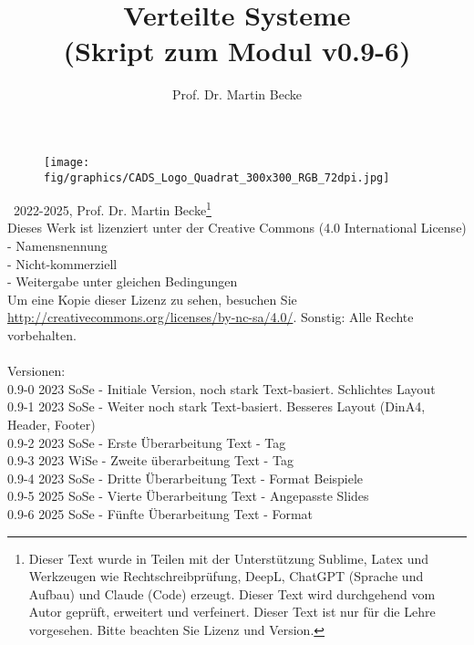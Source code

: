 \documentclass[a4paper,10pt]{book}
\title{Verteilte Systeme\\ (Skript zum Modul v0.9-6)}
\author{Prof. Dr. Martin Becke}
\begin{document}
\maketitle
\vspace*{\fill} %
\begin{figure}[h]
  \centering
  \texttt{[image: fig/graphics/CADS\_Logo\_Quadrat\_300x300\_RGB\_72dpi.jpg]} %
\end{figure}
\vspace*{\fill}

\newpage

\noindent
\textcopyright\ 2022-2025, Prof. Dr. Martin Becke\footnote{Dieser Text wurde in Teilen mit der Unterstützung Sublime, Latex und Werkzeugen wie Rechtschreibprüfung, DeepL, ChatGPT (Sprache und Aufbau) und Claude (Code) erzeugt. Dieser Text{} wird durchgehend vom Autor geprüft, erweitert und verfeinert. Dieser Text ist nur für die Lehre vorgesehen. Bitte beachten Sie Lizenz und Version.}\\
Dieses Werk ist lizenziert unter der Creative Commons (4.0 International License)\\
- Namensnennung\\ - Nicht-kommerziell\\ - Weitergabe unter gleichen Bedingungen \\Um eine Kopie dieser Lizenz zu sehen, besuchen Sie\\ \url{http://creativecommons.org/licenses/by-nc-sa/4.0/}. 
Sonstig: Alle Rechte vorbehalten.
\noindent
\\\\
Versionen:\\
0.9-0 2023 SoSe - Initiale Version, noch stark Text-basiert. Schlichtes Layout\\
0.9-1 2023 SoSe - Weiter noch stark Text-basiert. Besseres Layout (DinA4, Header, Footer)\\
0.9-2 2023 SoSe - Erste Überarbeitung Text - Tag\\
0.9-3 2023 WiSe - Zweite überarbeitung Text - Tag \\
0.9-4 2023 SoSe - Dritte Überarbeitung Text - Format Beispiele\\
0.9-5 2025 SoSe - Vierte Überarbeitung Text - Angepasste Slides\\
0.9-6 2025 SoSe - Fünfte Überarbeitung Text - Format\\
\end{document}
